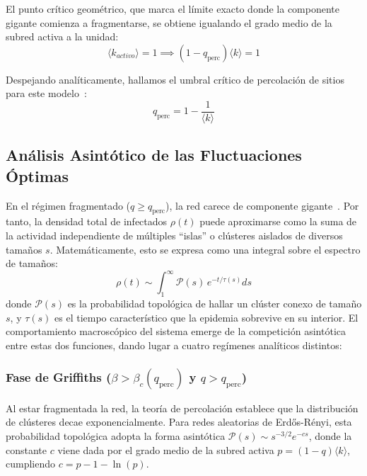\documentclass[%
reprint,
amsmath,amssymb,
aps,
]{revtex4-2}
\begin{document}
	El punto crítico geométrico, que marca el límite exacto donde la componente gigante comienza a fragmentarse, se obtiene igualando el grado medio de la subred activa a la unidad:
	\begin{equation}
		\langle k_{activo} \rangle = 1 \implies (1 - q_{\text{perc}}) \langle k \rangle = 1
	\end{equation}
	
	Despejando analíticamente, hallamos el umbral crítico de percolación de sitios para este modelo~\cite{Albert2002,Dorogovtsev2008,Muñoz2010}:
	\begin{equation}
		q_{\text{perc}} = 1 - \frac{1}{\langle k \rangle}
	\end{equation}
	
	\subsection{Análisis Asintótico de las Fluctuaciones Óptimas}	
	\label{apendice:fluctuaciones}
	
	En el régimen fragmentado ($q \ge q_{\text{perc}}$), la red carece de componente gigante~\cite{Albert2002,Dorogovtsev2008,Muñoz2010}. Por tanto, la densidad total de infectados $\rho(t)$ puede aproximarse como la suma de la actividad independiente de múltiples ``islas'' o clústeres aislados de diversos tamaños $s$. Matemáticamente, esto se expresa como una integral sobre el espectro de tamaños:
	\begin{equation}
		\rho(t) \sim \int_{1}^{\infty} \mathcal{P}(s) \, e^{-t/\tau(s)} ds
	\end{equation}
	donde $\mathcal{P}(s)$ es la probabilidad topológica de hallar un clúster conexo de tamaño $s$, y $\tau(s)$ es el tiempo característico que la epidemia sobrevive en su interior. El comportamiento macroscópico del sistema emerge de la competición asintótica entre estas dos funciones, dando lugar a cuatro regímenes analíticos distintos:
	
	\subsubsection{Fase de Griffiths ($\beta > \beta_c(q_{\text{perc}})$ y $q > q_{\text{perc}}$)~\cite{Muñoz2010,Noest1986}}
	Al estar fragmentada la red, la teoría de percolación establece que la distribución de clústeres decae exponencialmente. Para redes aleatorias de Erdős-Rényi, esta probabilidad topológica adopta la forma asintótica $\mathcal{P}(s) \sim s^{-3/2} e^{-cs}$, donde la constante $c$ viene dada por el grado medio de la subred activa $p = (1-q)\langle k \rangle$, cumpliendo $c = p - 1 - \ln(p)$. 
	
\end{document}
